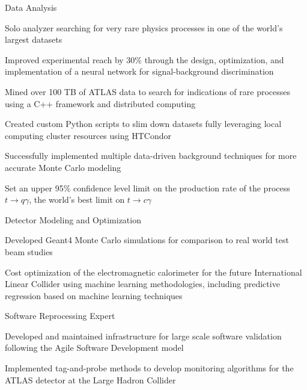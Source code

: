 
\begin{cventries}
  \cventry
    {Data Analysis} %
    {} %
    {} %
    {} %
    {
      \begin{cvitems} %
        \item {Solo analyzer searching for very rare physics processes in one of the world's largest datasets}
        \item {Improved experimental reach by 30\% through the design, optimization, and implementation of a neural network for signal-background discrimination}
        \item {Mined over 100 TB of ATLAS data to search for indications of rare processes using a C++ framework and distributed computing}
         \item{Created custom Python scripts to slim down datasets fully leveraging local computing cluster resources using HTCondor}
         \item{Successfully implemented multiple data-driven background techniques for more accurate Monte Carlo modeling}
         \item{Set an upper 95\% confidence level limit on the production rate of the process $t\rightarrow q\gamma$, the world's best limit on $t\rightarrow c\gamma$}
         	\end{cvitems}
    } 

    \cventry
    {Detector Modeling and Optimization}
    {}
    {}
    {}
    {
    \begin{cvitems}
    	\item Developed Geant4 Monte Carlo simulations for comparison to real world test beam studies
    	\item Cost optimization of the electromagnetic calorimeter for the future International Linear Collider using machine learning methodologies, including predictive regression based on machine learning techniques
    \end{cvitems}
    }
    
    \cventry
    {Software Reprocessing Expert} %
    {} %
    {} %
    {} %
    {
      \begin{cvitems} %
        \item {Developed and maintained infrastructure for large scale software validation following the Agile Software Development model }
        \item {Implemented tag-and-probe methods to develop monitoring algorithms for the ATLAS detector at the Large Hadron Collider}
      \end{cvitems}
    }     
    

\end{cventries}
